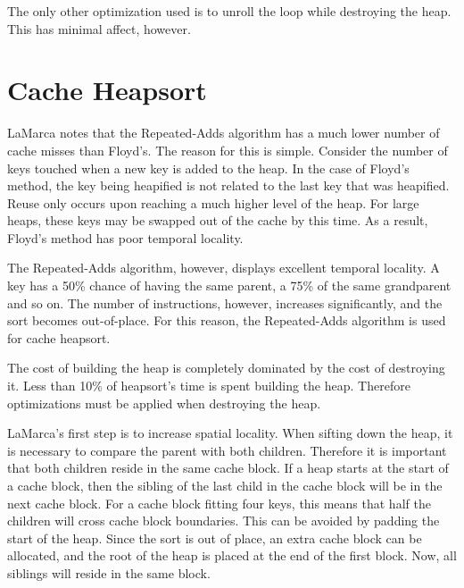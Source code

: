 The only other optimization used is to unroll the loop while destroying the
heap. This has minimal affect, however.

\section{Cache Heapsort}

LaMarca notes that the Repeated-Adds algorithm has a much lower number of cache
misses than Floyd's. The reason for this is simple. Consider the number of keys 
touched when a new key is added to the heap. In the case of Floyd's method, the
key being heapified is not related to the last key that was heapified. Reuse
only occurs upon reaching a much higher level of the heap. For large heaps, these
keys may be swapped out of the cache by this time. As a result, Floyd's method
has poor temporal locality.

The Repeated-Adds algorithm, however, displays excellent temporal locality. A
key has a 50\% chance of having the same parent, a 75\% of the same grandparent
and so on. The number of instructions, however, increases significantly, and the
sort becomes out-of-place. For this reason, the Repeated-Adds algorithm is used
for cache heapsort.

The cost of building the heap is completely dominated by the cost of
destroying it. Less than 10\% of heapsort's time is spent building the heap.
Therefore optimizations must be applied when destroying the heap.

LaMarca's first step is to increase spatial locality. When sifting down the
heap, it is necessary to compare the parent with both children. Therefore it is
important that both children reside in the same cache block. If a heap starts at
the start of a cache block, then the sibling of the last child in the cache
block will be in the next cache block.  For a cache block fitting four keys,
this means that half the children will cross cache block boundaries. This can be
avoided by padding the start of the heap. Since the sort is out of place, an
extra cache block can be allocated, and the root of the heap is placed at the end of
the first block. Now, all siblings will reside in the same block.

\begin{figure}[h]
\centering
{}
\end{figure}

